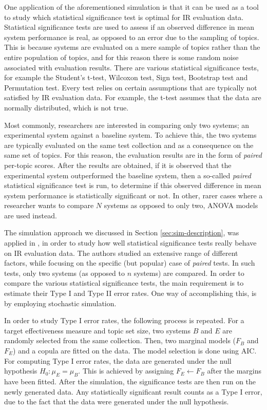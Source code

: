 One application of the aforementioned simulation is that it can be used as a tool to study which statistical significance test is optimal for IR evaluation data. Statistical significance tests are used to assess if an observed difference in mean system performance is real, as opposed to an error due to the sampling of topics. This is because systems are evaluated on a mere sample of topics rather than the entire population of topics, and for this reason there is some random noise associated with evaluation results. There are various statistical significance tests, for example the Student’s t-test, Wilcoxon test, Sign test, Bootstrap test and Permutation test. Every test relies on certain assumptions that are typically not satisfied by IR evaluation data. For example, the t-test assumes that the data are normally distributed, which is not true. 

Most commonly, researchers are interested in comparing only two systems; an experimental system against a baseline system. To achieve this, the two systems are typically evaluated on the same test collection and as a consequence on the same set of topics. For this reason, the evaluation results are in the form of \textit{paired} per-topic scores. After the results are obtained, if it is observed that the experimental system outperformed the baseline system, then a so-called \textit{paired} statistical significance test is run, to determine if this observed difference in mean system performance is statistically significant or not. In other, rarer cases where a researcher wants to compare $N$ systems as opposed to only two, ANOVA models are used instead.

The simulation approach we discussed in Section \ref{sec:sim-description}, was applied in \cite{Urbano2019}, in order to study how well statistical significance tests really behave on IR evaluation data. The authors studied an extensive range of different factors, while focusing on the specific (but popular) case of \textit{paired} tests. In such tests, only two systems (as opposed to $n$ systems) are compared. In order to compare the various statistical significance tests, the main requirement is to estimate their Type I and Type II error rates. One way of accomplishing this, is by employing stochastic simulation.

In order to study Type I error rates, the following process is repeated. For a target effectiveness measure and topic set size, two systems $B$ and $E$ are randomly selected from the same collection. Then, two marginal models ($F_B$ and $F_E$) and a copula are fitted on the data. The model selection is done using AIC. For computing Type I error rates, the data are generated under the null hypothesis $H_0: μ_E = μ_B$. This is achieved by assigning $F_E \leftarrow F_B$ after the margins have been fitted. After the simulation, the significance tests are then run on the newly generated data. Any statistically significant result counts as a Type I error, due to the fact that the data were generated under the null hypothesis.

